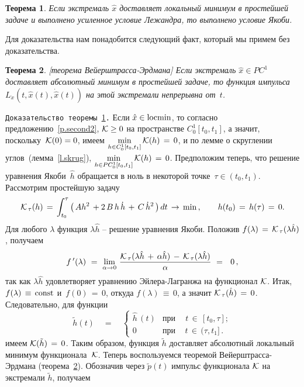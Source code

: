 \documentclass[12pt,a4paper]{article}
\newtheorem{theorem}{Теорема}
\newcommand{\cK}{{\cal{K}}}
\begin{document}
\begin{theorem}\label{th.Jakobi}
Если экстремаль $\hat x$ доставляет локальный минимум в
простейшей задаче и выполнено усиленное условие Лежандра, то
выполнено условие Якоби.
\end{theorem}
Для доказательства нам понадобится следующий факт, который мы примем без доказательства.
\begin{theorem}\label{th.ve}[теорема Вейерштрасса-Эрдмана]
Если экстремаль $\hat x \in PC^1$ доставляет абсолютный  минимум в
простейшей задаче, то функция импульса $L_{\dot x}(t, \hat x(t), \dot {\hat x}(t))$
на этой экстремали непрерывна от~$t$.
\end{theorem}

{\tt Доказательство теоремы~\ref{th.Jakobi}.} Если $\hat x\in {\rm locmin}$, то согласно предложению~\ref{p.second2},
 $\cK \ge 0$ на пространстве $C_0^1[t_0, t_1]$, а значит, поскольку~$\cK(0) = 0$, имеем
 $\min\limits_{h \in
C^1_0[t_0, t_1]}\cK(h)\, = \, 0$, и по лемме о скруглении
углов~(лемма~\ref{l.skrug}),  $\min\limits_{h \in
PC^1_0[t_0, t_1]}\cK(h)\, = \, 0$. Предположим теперь, что
 решение
уравнения Якоби~$\hat h$ обращается в ноль в некоторой точке~$\tau
\in (t_0, t_1)$. Рассмотрим простейшую задачу
$$
{\cK}_{\, \tau}(h)\, = \, \int_{t_0}^{\tau}\, \bigl(\, Ah^2\, +
2\, B\, h \, \dot h \, + \, C\, {\dot h}^2\, \bigr)\, d t\, \to \,
\min \, , \qquad h(t_0)\, = \, h(\tau)\, = \, 0.
$$
Для любого $\lambda $ функция $\lambda \hat h$ -- решение
уравнения Якоби. Положив $f(\lambda)\, = \, {\cK}_{\,
\tau}(\lambda \hat h)$, получаем
$$
f\,'(\lambda)\ = \ \lim_{\alpha \to 0}\, \frac{{\cK}_{\,
\tau}(\lambda \hat h \, + \, \alpha \hat h)\, - \, {\cK}_{\,
\tau}(\lambda \hat h )}{\alpha}\ = \  \ 0\, ,
$$
так как $\lambda \hat h$ удовлетворяет уравнению Эйлера-Лагранжа
на функционал $\cK$. Итак, $f(\lambda)\, \equiv \, {\rm const}$ и
$\, f(0)\, = \, 0$, откуда $f(\lambda)\, \equiv \, 0$, а значит
${\cK}_{\, \tau}(\hat h)\, = \, 0$. Следовательно, для функции
$$
\tilde h (t)\quad = \quad \left\{
\begin{array}{lll}
\hat h\, (t) & \mbox{при} \ & \ t \, \in \, [t_0, \tau] ; \\
0\ & \mbox{при} \ & \, t \, \in \, (\tau, t_1] \, .
\end{array}
\right.
$$
имеем $\cK(\tilde h)\, = \, 0$. Таким образом,  функция $\tilde h$
 доставляет абсолютный  локальный минимум функционала~$\cK$. Теперь
воспользуемся теоремой Вейерштрасса-Эрдмана (теорема~\ref{th.ve}).
 Обозначив через $\tilde p(t)$ импульс
функционала $\cK$ на экстремали $\tilde h$, получаем
\end{document}
